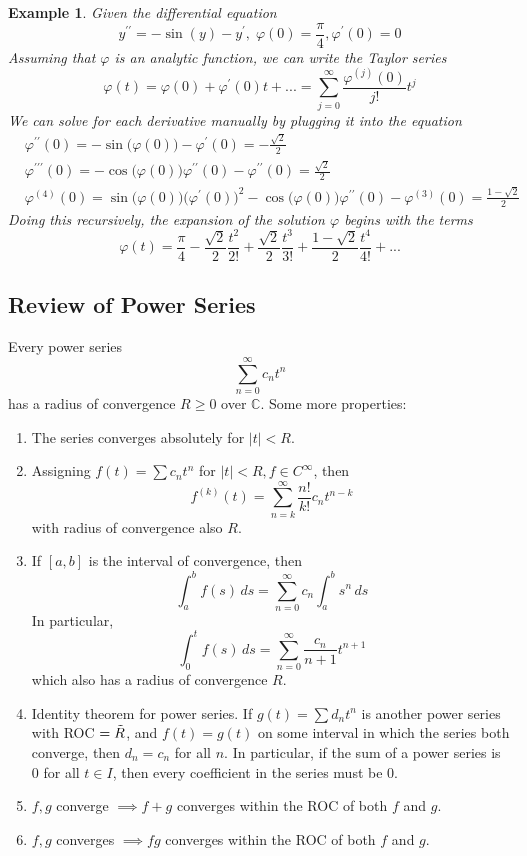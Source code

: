 \documentclass{article}
\newtheorem{example}{Example}[section]
\theoremstyle{remark}
\theoremstyle{definition}
\begin{document}
\begin{example}
Given the differential equation
\[y^{\prime \prime} = -\sin{(y)} - y^\prime, \; \varphi(0) = \frac{\pi}{4}, \varphi^\prime (0) = 0\]
Assuming that $\varphi$ is an analytic function, we can write the Taylor series 
\[\varphi(t) = \varphi(0) + \varphi^\prime (0) t + ... = \sum_{j=0}^\infty \frac{\varphi^{(j)} (0)}{j!} t^j\]
We can solve for each derivative manually by plugging it into the equation
\begin{align*}
    & \varphi^{\prime\prime} (0) = -\sin{\big( \varphi(0)\big)} - \varphi^\prime (0) = - \frac{\sqrt{2}}{2} \\
    & \varphi^{\prime\prime\prime} (0) = -\cos{\big(\varphi(0)\big)} \varphi^{\prime\prime}(0) - \varphi^{\prime\prime} (0) = \frac{\sqrt{2}}{2} \\
    & \varphi^{(4)} (0) = \sin{\Big(\varphi(0)\big)} \big( \varphi^\prime (0)\big)^2 - \cos{\Big(\varphi(0)\big)} \varphi^{\prime\prime} (0) - \varphi^{(3)} (0) = \frac{1-\sqrt{2}}{2}
\end{align*}
Doing this recursively, the expansion of the solution $\varphi$ begins with the terms 
\[\varphi(t) = \frac{\pi}{4} - \frac{\sqrt{2}}{2} \frac{t^2}{2!} + \frac{\sqrt{2}}{2} \frac{t^3}{3!} + \frac{1-\sqrt{2}}{2} \frac{t^4}{4!} + ...\]
\end{example}

\subsection{Review of Power Series}

Every power series 
\[\sum_{n=0}^\infty c_n t^n\]
has a radius of convergence $R \geq 0$ over $\mathbb{C}$. Some more properties: 
\begin{enumerate}
    \item The series converges absolutely for $|t| < R$. 
    \item Assigning $f(t) = \sum c_n t^n$ for $|t| < R, f \in C^\infty$, then 
    \[f^{(k)}(t) = \sum_{n=k}^\infty \frac{n!}{k!} c_n t^{n-k}\]
    with radius of convergence also $R$.
    \item If $[a, b]$ is the interval of convergence, then 
    \[\int_a^b f(s) \,ds = \sum_{n=0}^\infty c_n \int_a^b s^n \, ds\]
    In particular, 
    \[\int_0^t f(s)\,ds = \sum_{n=0}^\infty \frac{c_n}{n+1} t^{n+1}\]
    which also has a radius of convergence $R$. 
    \item Identity theorem for power series. If $g(t) = \sum d_n t^n$ is another power series with ROC $= \Tilde{R}$, and $f(t) = g(t)$ on some interval in which the series both converge, then $d_n = c_n$ for all $n$. In particular, if the sum of a power series is $0$ for all $t \in I$, then every coefficient in the series must be $0$. 
    \item $f, g$ converge $\implies f+g$ converges within the ROC of both $f$ and $g$. 
    \item $f, g$ converges $\implies fg$ converges within the ROC of both $f$ and $g$. 
\end{enumerate}
\end{document}
